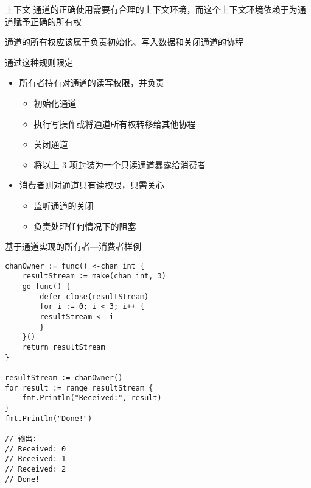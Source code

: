 \begin{frame}{上下文}
    通道的正确使用需要有合理的上下文环境，而这个上下文环境依赖于为通道赋予正确的所有权

    \bigskip
    \alert{通道的所有权应该属于负责初始化、写入数据和关闭通道的协程}
    
    通过这种规则限定
    \begin{itemize}
        \item \alert{所有者}持有对通道的\alert{读写权限}，并负责
            \begin{itemize}
                \item 初始化通道
                \item 执行写操作或将通道所有权转移给其他协程
                \item \alert{关闭通道}
                \item 将以上 3 项封装为一个只读通道暴露给消费者
            \end{itemize}
        \item \alert{消费者}则对通道只有\alert{读权限}，只需关心
            \begin{itemize}
                \item 监听通道的关闭
                \item 负责处理任何情况下的阻塞
            \end{itemize}
    \end{itemize} 
\end{frame}

\begin{frame}[fragile]{基于通道实现的所有者---消费者样例}
\begin{lstlisting}[xleftmargin=8pt]
chanOwner := func() <-chan int {
    resultStream := make(chan int, 3)
    go func() {
        defer close(resultStream)
        for i := 0; i < 3; i++ {
        resultStream <- i
        }
    }()
    return resultStream
}
    
resultStream := chanOwner()
for result := range resultStream {
    fmt.Println("Received:", result)
}
fmt.Println("Done!")

// 输出:
// Received: 0
// Received: 1
// Received: 2
// Done!    
\end{lstlisting}
\end{frame}